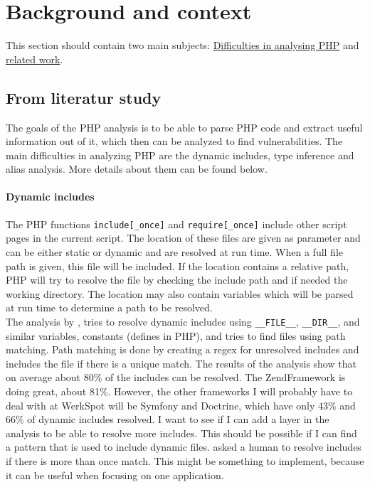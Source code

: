 \documentclass[../main.tex]{subfiles}
\begin{document}
    \section{Background and context}\label{sec:background}
    This section should contain two main subjects: \underline{Difficulties in analysing PHP} and \underline{related work}.
    \subsection{From literatur study}
    \label{phpdynamics}
The goals of the PHP analysis is to be able to parse PHP code and extract useful information out of it, which then can be analyzed to find vulnerabilities.
The main difficulties in analyzing PHP are the dynamic includes, type inference and alias analysis. 
More details about them can be found below.
\paragraph{Dynamic includes}
\label{includes}
The PHP functions \texttt{include[\_once]} and \texttt{require[\_once]} include other script pages in the current script.
The location of these files are given as parameter and can be either static or dynamic and are resolved at run time.
When a full file path is given, this file will be included.
If the location contains a relative path, PHP will try to resolve the file by checking the include path and if needed the working directory.
The location may also contain variables which will be parsed at run time to determine a path to be resolved.
\\
The analysis by  \autocite{Hil:12}, tries to resolve dynamic includes using \texttt{\_\_FILE\_\_}, \texttt{\_\_DIR\_\_}, and similar variables, constants (defines in PHP), and tries to find files using path matching.
Path matching is done by creating a regex for unresolved includes and includes the file if there is a unique match.
The results of the analysis show that on average about 80\% of the includes can be resolved.
The ZendFramework is doing great, about 81\%. However, the other frameworks I will probably have to deal with at WerkSpot will be Symfony and Doctrine, which have only 43\% and 66\% of dynamic includes resolved. 
I want to see if I can add a layer in the analysis to be able to resolve more includes. 
This should be possible if I can find a pattern that is used to include dynamic files.
 \autocite{Son:11} asked a human to resolve includes if there is more than once match.
This might be something to implement, because it can be useful when focusing on one application.
\end{document}

